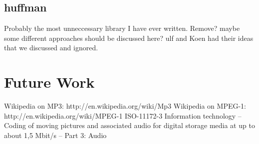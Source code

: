 \documentclass[a4paper,12pt]{article}
\begin{document}
    \subsection{huffman}
    \label{sec:huffman}
        Probably the most unneccessary library I have ever written. Remove?
        maybe some different approaches should be discussed here? ulf and Koen
        had their ideas that we discussed and ignored.

\section{Future Work}

\begin{thebibliography}{99}
        Wikipedia on MP3: http://en.wikipedia.org/wiki/Mp3
        Wikipedia on MPEG-1: http://en.wikipedia.org/wiki/MPEG-1
        ISO-11172-3 Information technology -- Coding of moving pictures and
        associated audio for digital storage media at up to about 1,5 Mbit/s --
        Part 3: Audio
\end{thebibliography}
\end{document}
